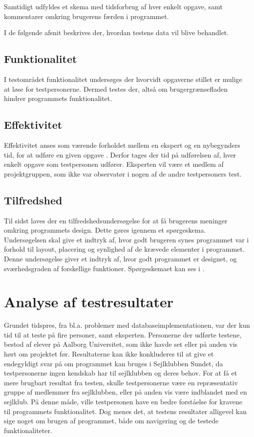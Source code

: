 Samtidigt udfyldes et skema med tidsforbrug af hver enkelt opgave, samt kommentarer omkring brugerens færden i programmet.

I de følgende afsnit beskrives der, hvordan testens data vil blive behandlet.

\subsection{Funktionalitet}
I testområdet funktionalitet undersøges der hvorvidt opgaverne stillet er mulige at løse for testpersonerne.
Dermed testes der, altså om brugergrænsefladen hindrer programmets funktionalitet.

\subsection{Effektivitet}
Effektivitet anses som værende forholdet mellem en ekspert og en nybegynders tid, for at udføre en given opgave \citep{UIEffeciency}.
Derfor tages der tid på udførelsen af, hver enkelt opgave som testpersonen udfører.
Eksperten vil være et medlem af projektgruppen, som ikke var observatør i nogen af de andre testpersoners test. 

\subsection{Tilfredshed}
Til sidst laves der en tilfredshedsundersøgelse for at få brugerens meninger omkring programmets design. 
Dette gøres igennem et spørgeskema. 
Undersøgelsen skal give et indtryk af, hvor godt brugeren synes programmet var i forhold til layout, placering og synlighed af de krævede elementer i programmet. 
Denne undersøgelse giver et indtryk af, hvor godt programmet er designet, og sværhedsgraden af forskellige funktioner. 
Spørgeskemaet kan ses i . \citep{UISatisfaction}


\section{Analyse af testresultater}

Grundet tidspres, fra bl.a. problemer med databaseimplementationen, var der kun tid til at teste på fire personer, samt eksperten.
Personerne der udførte testene, bestod af elever på Aalborg Universitet, som ikke havde set eller på anden vis hørt om projektet før.
Resultaterne kan ikke konkluderes til at give et endegyldigt svar på om programmet kan bruges i Sejlklubben Sundet, da testpersonerne ingen kendskab har til sejlklubben og deres behov.
For at få et mere brugbart resultat fra testen, skulle testpersonerne være en repræsentativ gruppe af medlemmer fra sejlklubben, eller på anden vis være indblandet med en sejlklub. 
På denne måde, ville testpersonen have en bedre forståelse for kravene til programmets funktionalitet.
Dog menes det, at testens resultater alligevel kan sige noget om brugen af programmet, både om navigering og de testede funktionaliteter.
